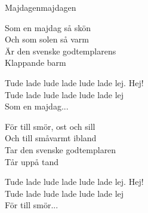 \begin{song}{Majdagen}{majdagen}
\begin{vers}
Som en majdag så skön\\
Och som solen så varm\\
Är den svenske godtemplarens\\
Klappande barm\\
\end{vers}
\begin{vers}
Tude lade lude lade lude lade lej. Hej!\\
Tude lade lude lade lude lade lej\\
Som en majdag...
\end{vers}
\begin{vers}
För till smör, ost och sill\\
Och till småvarmt ibland\\
Tar den svenske godtemplaren\\
Tår uppå tand\\
\end{vers}
\begin{vers}
Tude lade lude lade lude lade lej. Hej!\\
Tude lade lude lade lude lade lej\\
För till smör...
\end{vers}
\end{song}
